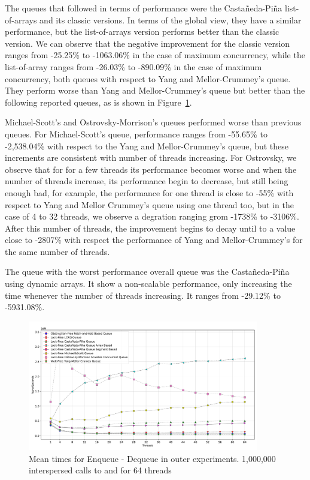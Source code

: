 The queues that followed in terms of performance were the Castañeda-Piña list-of-arrays and its classic versions. In terms of the global view, they have a similar performance, but the list-of-arrays version performs better than the classic version. We can observe that the negative improvement for the classic version ranges from -25.25\% to -1063.06\% in the case of maximum concurrency, while the list-of-array ranges from -26.03\% to -890.09\% in the case of maximum concurrency, both queues with respect to Yang and Mellor-Crummey's queue. They perform worse than Yang and Mellor-Crummey's queue but better than the following reported queues, as is shown in Figure~\ref{fig:64-outer--enq-deq}.

%


Michael-Scott's and Ostrovsky-Morrison's queues performed worse than previous queues. For Michael-Scott's queue, performance ranges from -55.65\% to -2,538.04\% with respect to the Yang and Mellor-Crummey's queue, but these increments are consistent with number of threads increasing. For Ostrovsky, we observe that for for a few threads its performance becomes worse and when the number of threads increase, its performance begin to decrease, but still being enough bad, for example, the performance for one thread is close to -55\% with respect to Yang and Mellor Crummey's queue using one thread too, but in the case of 4 to 32  threads, we observe a degration ranging grom -1738\% to -3106\%. After this number of threads, the improvement begins to decay until to a value close to -2807\% with respect the performance of Yang and Mellor-Crummey's for the same number of threads.

The queue with the worst performance overall queue was the Castañeda-Piña using dynamic arrays. It show a non-scalable performance, only increasing the time whenever the number of threads increasing. It ranges from -29.12\% to -5931.08\%.


\begin{figure}[ht]
  \centering
  \includegraphics[width=0.9\textwidth]{contents/figures/V_64_outer_enq_deq_all.pdf}
  \caption{\label{fig:64-outer--enq-deq} Mean times for Enqueue - Dequeue in outer experiments. 1,000,000 interspersed calls to \Enq and \Deq  for 64 threads}
\end{figure}

